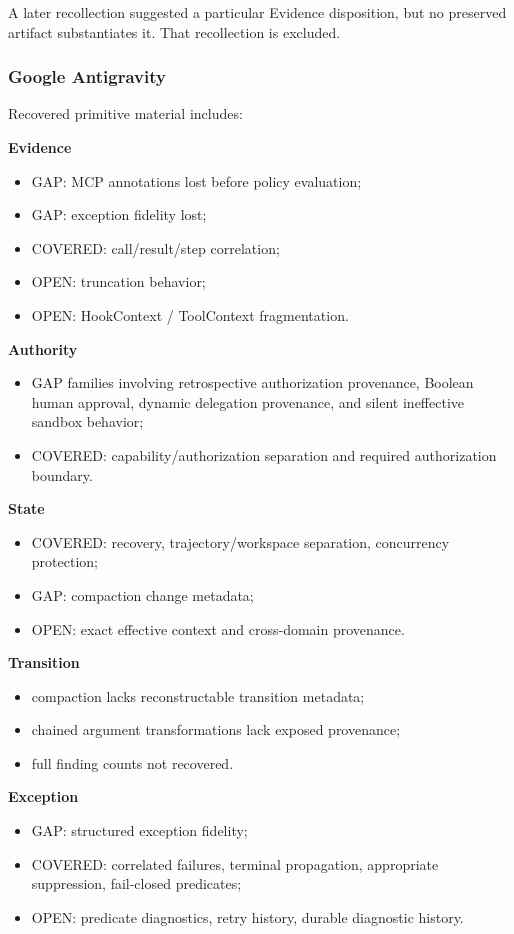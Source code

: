 \documentclass[11pt]{article}
\begin{document}
A later recollection suggested a particular Evidence disposition, but no preserved artifact substantiates it. That recollection is excluded.

\subsubsection{Google Antigravity}

Recovered primitive material includes:

\textbf{Evidence}
\begin{itemize}
\item GAP: MCP annotations lost before policy evaluation;
\item GAP: exception fidelity lost;
\item COVERED: call/result/step correlation;
\item OPEN: truncation behavior;
\item OPEN: HookContext / ToolContext fragmentation.
\end{itemize}

\textbf{Authority}
\begin{itemize}
\item GAP families involving retrospective authorization provenance, Boolean human approval, dynamic delegation provenance, and silent ineffective sandbox behavior;
\item COVERED: capability/authorization separation and required authorization boundary.
\end{itemize}

\textbf{State}
\begin{itemize}
\item COVERED: recovery, trajectory/workspace separation, concurrency protection;
\item GAP: compaction change metadata;
\item OPEN: exact effective context and cross-domain provenance.
\end{itemize}

\textbf{Transition}
\begin{itemize}
\item compaction lacks reconstructable transition metadata;
\item chained argument transformations lack exposed provenance;
\item full finding counts not recovered.
\end{itemize}

\textbf{Exception}
\begin{itemize}
\item GAP: structured exception fidelity;
\item COVERED: correlated failures, terminal propagation, appropriate suppression, fail-closed predicates;
\item OPEN: predicate diagnostics, retry history, durable diagnostic history.
\end{itemize}
\end{document}
